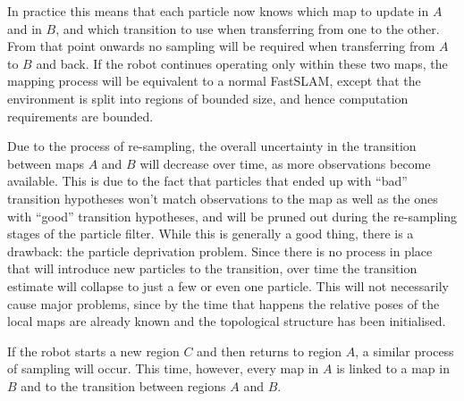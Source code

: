 In practice this means that each particle now knows which map to update
in $A$ and in $B$, and which transition to use when transferring from
one to the other. From that point onwards no sampling will be required
when transferring from $A$ to $B$ and back. If the robot continues
operating only within these two maps, the mapping process will be
equivalent to a normal FastSLAM, except that the environment is split
into regions of bounded size, and hence computation requirements are
bounded.

Due to the process of re-sampling, the overall uncertainty in the
transition between maps $A$ and $B$ will decrease over time, as more
observations become available. This is due to the fact that particles
that ended up with ``bad'' transition hypotheses won't match
observations to the map as well as the ones with ``good'' transition
hypotheses, and will be pruned out during the re-sampling stages of
the particle filter. While this is generally a good thing, there is a
drawback: the particle deprivation problem. Since there is no process in
place that will introduce new particles to the transition, over time
the transition estimate will collapse to just a few or even one
particle. This will not necessarily cause major problems, since by the
time that happens the relative poses of the local maps are already known
and the topological structure has been initialised.


If the robot starts a new region $C$ and then returns to
region $A$, a similar process of sampling will occur. This time,
however, every map in $A$ is linked to a map in $B$ and to the
transition between regions $A$ and $B$.


